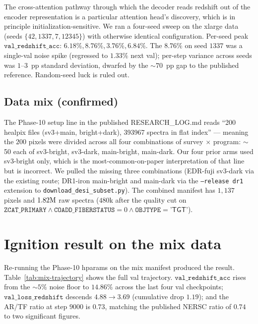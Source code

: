 \documentclass[11pt,letterpaper]{article}
\newcommand{\valz}{\texttt{val\_redshift\_acc}}
\newcommand{\valzloss}{\texttt{val\_loss\_redshift}}
\begin{document}
The cross-attention pathway through which the decoder reads redshift
out of the encoder representation is a particular attention head's
discovery, which is in principle initialization-sensitive. We ran a
four-seed sweep on the xlarge data (seeds $\{42, 1337, 7, 12345\}$)
with otherwise identical configuration. Per-seed peak $\valz$:
$6.18\%, 8.76\%, 3.76\%, 6.84\%$. The $8.76\%$ on seed $1337$ was a
single-val noise spike (regressed to $1.33\%$ next val); per-step
variance across seeds was $1$--$3$~pp standard deviation, dwarfed by
the $\sim$$70$~pp gap to the published reference. Random-seed luck
is ruled out.

\subsection{Data mix (confirmed)}

The Phase-10 setup line in the published RESEARCH\_LOG.md reads
``200 healpix files (sv3+main, bright+dark), 393967 spectra in flat
index'' --- meaning the $200$ pixels were divided across all four
combinations of survey $\times$ program: $\sim$50 each of sv3-bright,
sv3-dark, main-bright, main-dark. Our four prior arms used sv3-bright
only, which is the most-common-on-paper interpretation of that line
but is incorrect. We pulled the missing three combinations
(EDR-fuji sv3-dark via the existing route; DR1-iron main-bright and
main-dark via the \texttt{--release dr1} extension to
\texttt{download\_desi\_subset.py}). The combined manifest has
$1{,}137$ pixels and $1.82{\rm M}$ raw spectra ($480$k after the
quality cut on $\texttt{ZCAT\_PRIMARY} \wedge
\texttt{COADD\_FIBERSTATUS}{=}0 \wedge \texttt{OBJTYPE}{=}\textsf{'TGT'}$).

\section{Ignition result on the mix data}

Re-running the Phase-10 hparams on the mix manifest produced the
result. Table~\ref{tab:mix-trajectory} shows the full val trajectory.
$\valz$ rises from the $\sim$$5\%$ noise floor to $14.86\%$
across the last four val checkpoints; $\valzloss$ descends
$4.88 \to 3.69$ (cumulative drop $1.19$); and the AR/TF ratio at
step $9000$ is $0.73$, matching the published NERSC ratio of
$0.74$ to two significant figures.
\end{document}
